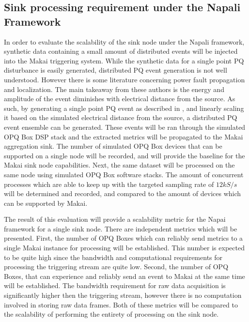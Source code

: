 \subsection{Sink processing requirement under the Napali Framework} \label{iexp:sec:scale}
In order to evaluate the scalability of the sink node under the Napali framework, synthetic data containing a small amount of distributed events will be injected into the Makai triggering system. While the synthetic data for a single point PQ disturbance is easily generated, distributed PQ event generation is not well understood. However there is some literature concerning power fault propagation and localization. \cite{parsons1998direction} \cite{polajvzer2017evaluation} The main takeaway from these authors is the energy and amplitude of the event diminishes with electrical distance from the source. As such, by generating a single point PQ event as described in \cite{kumar2015power}\cite{tan2013simulation}, and linearly scaling it based on the simulated electrical distance from the source, a distributed PQ event ensemble can be generated. These events will be ran through the simulated OPQ Box DSP stack and the extracted metrics will be propagated to the Makai aggregation sink. The number of simulated OPQ Box devices that can be supported on a single node will be recorded, and will provide the baseline for the Makai sink node capabilities. Next, the same dataset will be processed on the same node using simulated OPQ Box software stacks. The amount of concurrent processes which are able to keep up with the targeted sampling rate of $12kS/s$ will be determined and recorded, and compared to the amount of devices which can be supported by Makai.

The result of this evaluation will provide a scalability metric for the Napai framework for a single sink node. There are independent metrics which will be presented. First, the number of OPQ Boxes which can reliably send metrics to a single Makai instance for processing will be established. This number is expected to be quite high since the bandwidth and computational requirements for processing the triggering stream are quite low. Second, the number of OPQ Boxes, that can experience and reliably send an event to Makai at the same time will be established. The bandwidth requirement for raw data acquisition is significantly higher then the triggering stream, however there is no computation involved in storing raw data frames. Both of these metrics will be compared to the scalability of performing the entirety of processing on the sink node.

